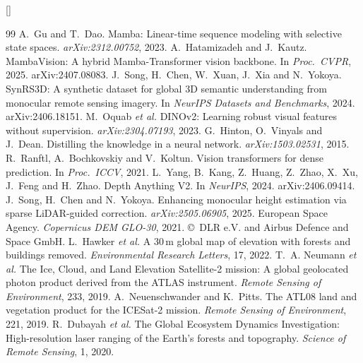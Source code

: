 \documentclass[11pt,a4paper]{article}
\begin{document}
\begingroup
\small
\renewcommand{\refname}{References}
\titleformat{\section}[block]{\Large\bfseries}{}{0em}{}[{\vspace{-1.5pt}\titlerule[0.6pt]}]
\begin{thebibliography}{99}\setlength{\itemsep}{1pt}
 A.~Gu and T.~Dao. Mamba: Linear-time sequence modeling with selective state spaces. \emph{arXiv:2312.00752}, 2023.
 A.~Hatamizadeh and J.~Kautz. MambaVision: A hybrid Mamba-Transformer vision backbone. In \emph{Proc.\ CVPR}, 2025. arXiv:2407.08083.
 J.~Song, H.~Chen, W.~Xuan, J.~Xia and N.~Yokoya. SynRS3D: A synthetic dataset for global 3D semantic understanding from monocular remote sensing imagery. In \emph{NeurIPS Datasets and Benchmarks}, 2024. arXiv:2406.18151.
 M.~Oquab \emph{et al.} DINOv2: Learning robust visual features without supervision. \emph{arXiv:2304.07193}, 2023.
 G.~Hinton, O.~Vinyals and J.~Dean. Distilling the knowledge in a neural network. \emph{arXiv:1503.02531}, 2015.
 R.~Ranftl, A.~Bochkovskiy and V.~Koltun. Vision transformers for dense prediction. In \emph{Proc.\ ICCV}, 2021.
 L.~Yang, B.~Kang, Z.~Huang, Z.~Zhao, X.~Xu, J.~Feng and H.~Zhao. Depth Anything V2. In \emph{NeurIPS}, 2024. arXiv:2406.09414.
 J.~Song, H.~Chen and N.~Yokoya. Enhancing monocular height estimation via sparse LiDAR-guided correction. \emph{arXiv:2505.06905}, 2025.
 European Space Agency. \emph{Copernicus DEM GLO-30}, 2021. \copyright~DLR e.V. and Airbus Defence and Space GmbH.
 L.~Hawker \emph{et al.} A 30\,m global map of elevation with forests and buildings removed. \emph{Environmental Research Letters}, 17, 2022.
 T.~A. Neumann \emph{et al.} The Ice, Cloud, and Land Elevation Satellite-2 mission: A global geolocated photon product derived from the ATLAS instrument. \emph{Remote Sensing of Environment}, 233, 2019.
 A.~Neuenschwander and K.~Pitts. The ATL08 land and vegetation product for the ICESat-2 mission. \emph{Remote Sensing of Environment}, 221, 2019.
 R.~Dubayah \emph{et al.} The Global Ecosystem Dynamics Investigation: High-resolution laser ranging of the Earth's forests and topography. \emph{Science of Remote Sensing}, 1, 2020.

\end{thebibliography}
\end{document}

